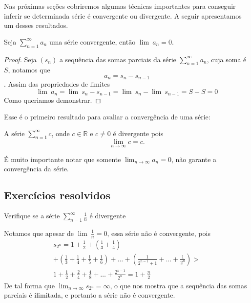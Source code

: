 Nas próximas seções cobriremos algumas técnicas importantes para conseguir inferir
se determinada série é convergente ou divergente. A seguir apresentamos um desses
resultados.

\begin{teo}
    Seja $\sum_{n = 1}^{\infty} a_n$ uma série convergente, então $\lim{\:} a_n = 0$.
\end{teo}

\begin{proof}
    Seja $(s_n)$ a sequência das somas parciais da série $\sum_{n = 1}^{\infty} a_n$, cuja soma é $S$, notamos que
    $$a_n = s_n - s_{n-1}$$.
    Assim das propriedades de limites
    $$\lim{\:} a_n = \lim {\:}s_n - s_{n-1} = \lim {\:} s_n - \lim {\:}s_{n-1} = S - S = 0$$
    Como queriamos demonstrar.
\end{proof}

Esse é o primeiro resultado para avaliar a convergência de uma série:
\begin{ex}
    A série $\sum_{n = 1}^{\infty} c$, onde $c \in \mathbb{R}$ e $c \neq 0$ é 
    divergente pois
    $$\lim_{n \to \infty} c = c.$$
\end{ex}

É muito importante notar que somente $\lim_{n \to \infty} a_n = 0$, não garante a convergência
da série.
\subsection*{Exercícios resolvidos}

\construirExeresol
\begin{exeresol}
    Verifique se a série $\sum_{n = 1}^{\infty} \frac{1}{n}$ é divergente 
\end{exeresol}

\begin{resol}
    Notamos que apesar de $\lim{\:} \frac{1}{n} = 0$, essa série não é convergente,
    pois
\begin{eqnarray}
    s_{2^n} = 1 + \frac{1}{2} + (\frac{1}{3}+\frac{1}{4}) \\
    + (\frac{1}{3}+\frac{1}{4}+\frac{1}{5}+\frac{1}{6})+\dots+(\frac{1}{2^{n-1}+1}+\dots +\frac{1}{2^n}) > \\
    1 + \frac{1}{2}+\frac{2}{4}+ \frac{4}{8}+ \dots +\frac{2^{n-1}}{2^n} = 1 + \frac{n}{2}
\end{eqnarray}   
    De tal forma que $\lim_{n \to \infty} s_{2^n} = \infty$, o que nos mostra que
    a sequência das somas parciais é ilimitada, e portanto a série não é
    convergente.
 \end{resol}

